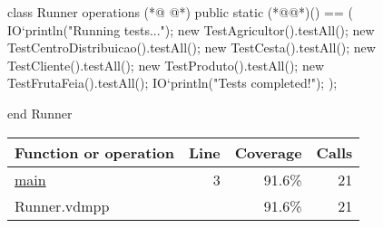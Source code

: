 \begin{vdmpp}[breaklines=true]
class Runner
  operations
(*@
\label{main:3}
@*)
    public static (*@@*)() == (
      IO`println("Running tests...");
      new TestAgricultor().testAll();
      new TestCentroDistribuicao().testAll();
      new TestCesta().testAll();
      new TestCliente().testAll();
      new TestProduto().testAll();
      new TestFrutaFeia().testAll();
      IO`println("Tests completed!");
    );
    
end Runner
\end{vdmpp}
\bigskip
\begin{longtable}{|l|r|r|r|}
\hline
Function or operation & Line & Coverage & Calls \\
\hline
\hline
\hyperref[main:3]{main} & 3&91.6\% & 21 \\
\hline
\hline
Runner.vdmpp & & 91.6\% & 21 \\
\hline
\end{longtable}

